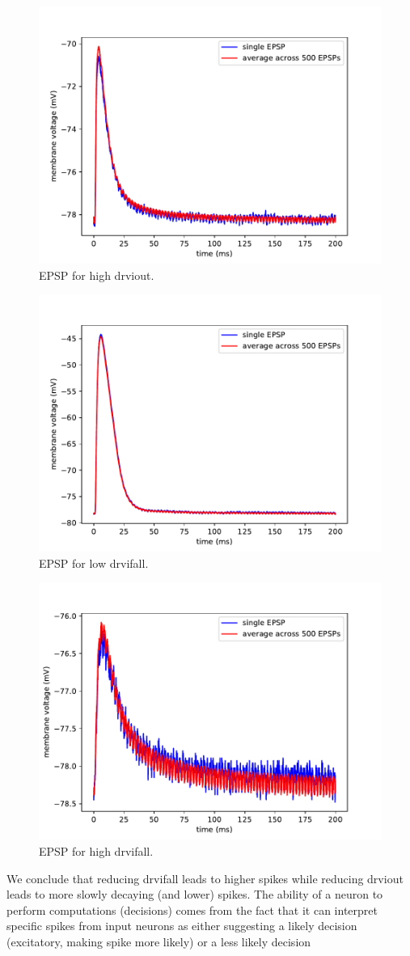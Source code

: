 \documentclass[a4paper,twocolumn]{article}
\begin{document}
\begin{figure}[ht]
    \centering
    \includegraphics[width=.5\textwidth]{figures/epsp_out_+.pdf}
    \caption{EPSP for high drviout.}
    \label{fig:feed-forward}
\end{figure}
\begin{figure}[ht]
    \centering
    \includegraphics[width=.5\textwidth]{figures/epsp_fall_-.pdf}
    \caption{EPSP for low drvifall.}
    \label{fig:feed-forward}
\end{figure}
\begin{figure}[ht]
    \centering
    \includegraphics[width=.5\textwidth]{figures/epsp_fall_+.pdf}
    \caption{EPSP for high drvifall.}
    \label{fig:feed-forward}
\end{figure}
We conclude that reducing drvifall leads to higher spikes while reducing drviout 
leads to more slowly decaying (and lower) spikes.
The ability of a neuron to perform computations (decisions) comes from the fact 
that it can interpret specific spikes from input neurons as either suggesting 
a likely decision (excitatory,  making spike more likely) or  a less likely decision 
\end{document}
